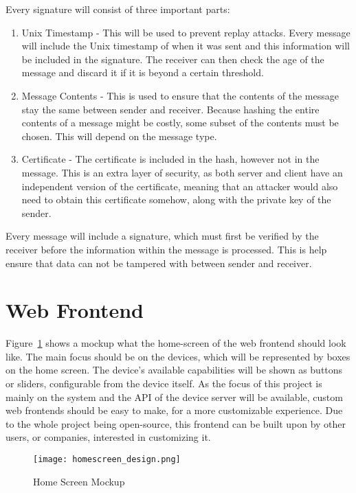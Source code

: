 Every signature will consist of three important parts:
\begin{enumerate}
    \item Unix Timestamp - This will be used to prevent replay attacks. Every message will include the Unix timestamp of when it was sent and this information will be included in the signature. The receiver can then check the age of the message and discard it if it is beyond a certain threshold.
    \item Message Contents - This is used to ensure that the contents of the message stay the same between sender and receiver. Because hashing the entire contents of a message might be costly, some subset of the contents must be chosen. This will depend on the message type.
    \item Certificate - The certificate is included in the hash, however not in the message. This is an extra layer of security, as both server and client have an independent version of the certificate, meaning that an attacker would also need to obtain this certificate somehow, along with the private key of the sender.
\end{enumerate}

Every message will include a signature, which must first be verified by the receiver before the information within the message is processed. This is help ensure that data can not be tampered with between sender and receiver.


\section{Web Frontend} \label{sec:chapdesign:frontend}
Figure~\ref{fig:home_screen_mockup} shows a mockup what the home-screen of the web frontend should look like. The main focus should be on the devices, which will be represented by boxes on the home screen. The device's available capabilities will be shown as buttons or sliders, configurable from the device itself. As the focus of this project is mainly on the system and the API of the device server will be available, custom web frontends should be easy to make, for a more customizable experience. Due to the whole project being open-source, this frontend can be built upon by other users, or companies, interested in customizing it.

\begin{figure}[h]
\caption{Home Screen Mockup}
\texttt{[image: homescreen\_design.png]}
\label{fig:home_screen_mockup}
\end{figure}

